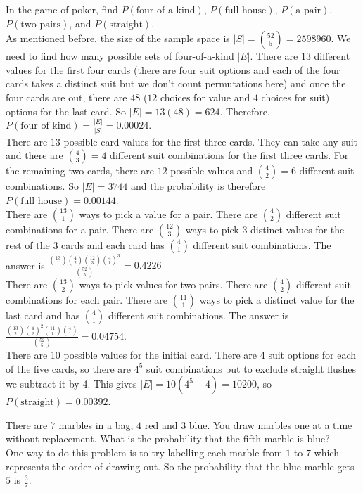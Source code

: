 \documentclass[12pt, a4paper]{article}
\newcounter{exa}
\begin{document}
\begin{texample}
In the game of poker, find $P(\text{four of a kind})$, $P(\text{full house})$, $P(\text{a pair})$, $P(\text{two pairs})$, and $P(\text{straight})$. \\

As mentioned before, the size of the sample space is $|S|=\binom{52}{5}=2598960$. We need to find how many possible sets of four-of-a-kind $|E|$. There are $13$ different values for the first four cards (there are four suit options and each of the four cards takes a distinct suit but we don't count permutations here) and once the four cards are out, there are $48$ ($12$ choices for value and $4$ choices for suit) options for the last card. So $|E|=13(48)=624$. Therefore, $P(\text{four of kind})=\frac{|E|}{|S|}=0.00024$. \\

There are $13$ possible card values for the first three cards. They can take any suit and there are $\binom{4}{3}=4$ different suit combinations for the first three cards. For the remaining two cards, there are $12$ possible values and $\binom{4}{2}=6$ different suit combinations. So $|E|=3744$ and the probability is therefore $P(\text{full house})=0.00144$. \\

There are $\binom{13}{1}$ ways to pick a value for a pair. There are $\binom{4}{2}$ different suit combinations for a pair. There are $\binom{12}{3}$ ways to pick $3$ distinct values for the rest of the $3$ cards and each card has $\binom{4}{1}$ different suit combinations. The answer is $\frac{\binom{13}{1}\binom{4}{2}\binom{12}{3}\binom{4}{1}^3}{\binom{52}{5}}=0.4226$. \\

There are $\binom{13}{2}$ ways to pick values for two pairs. There are $\binom{4}{2}$ different suit combinations for each pair. There are $\binom{11}{1}$ ways to pick a distinct value for the last card and has $\binom{4}{1}$ different suit combinations. The answer is $\frac{\binom{13}{2}\binom{4}{2}^2\binom{11}{1}\binom{4}{1}}{\binom{52}{5}}=0.04754$. \\

There are 10 possible values for the initial card. There are 4 suit options for each of the five cards, so there are $4^5$ suit combinations but to exclude straight flushes we subtract it by 4. This gives $|E|=10(4^5-4)=10200$, so $P(\text{straight})=0.00392$.
\end{texample}

\begin{texample}
There are $7$ marbles in a bag, $4$ red and $3$ blue. You draw marbles one at a time without replacement. What is the probability that the fifth marble is blue? \\

One way to do this problem is to try labelling each marble from $1$ to $7$ which represents the order of drawing out. So the probability that the blue marble gets $5$ is $\frac37$.
\end{texample}
\end{document}
